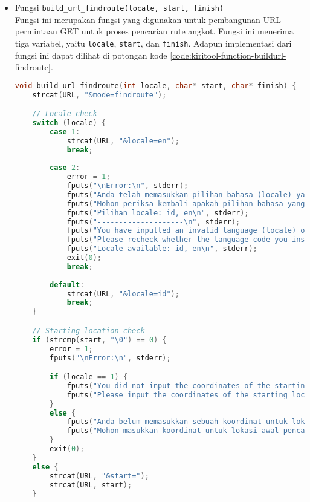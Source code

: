 \begin{itemize}[listparindent=\parindent]
	\item Fungsi \verb|build_url_findroute(locale, start, finish)| \\
	Fungsi ini merupakan fungsi yang digunakan untuk pembangunan URL permintaan	GET untuk proses pencarian rute angkot. Fungsi ini menerima tiga variabel, yaitu \verb|locale|, \verb|start|, dan \verb|finish|. Adapun implementasi dari fungsi ini dapat dilihat di potongan kode \ref{code:kiritool-function-buildurl-findroute}.
	
	\begin{lstlisting}[language=C, caption=Implementasi fungsi build\textunderscore url\textunderscore findroute(), label=code:kiritool-function-buildurl-findroute]
void build_url_findroute(int locale, char* start, char* finish) {
    strcat(URL, "&mode=findroute");

    // Locale check
    switch (locale) {
        case 1:
            strcat(URL, "&locale=en");
            break;
        
        case 2:
            error = 1;
            fputs("\nError:\n", stderr);
            fputs("Anda telah memasukkan pilihan bahasa (locale) yang tidak valid.\n", stderr);
            fputs("Mohon periksa kembali apakah pilihan bahasa yang anda masukkan valid atau tidak.\n", stderr);
            fputs("Pilihan locale: id, en\n", stderr);
            fputs("--------------------\n", stderr);
            fputs("You have inputted an invalid language (locale) option.\n", stderr);
            fputs("Please recheck whether the language code you inserted was supported or not.\n", stderr);
            fputs("Locale available: id, en\n", stderr);
            exit(0);
            break;
        
        default:
            strcat(URL, "&locale=id");
            break;
    }

    // Starting location check
    if (strcmp(start, "\0") == 0) {
        error = 1;
        fputs("\nError:\n", stderr);

        if (locale == 1) {
            fputs("You did not input the coordinates of the starting location.\n", stderr);
            fputs("Please input the coordinates of the starting location through the corresponding option.\n", stderr);
        }
        else {
            fputs("Anda belum memasukkan sebuah koordinat untuk lokasi awal.\n", stderr);
            fputs("Mohon masukkan koordinat untuk lokasi awal pencarian rute melalui opsi yang sesuai.\n", stderr);
        }
        exit(0);
    }
    else {
        strcat(URL, "&start=");
        strcat(URL, start);
    }


\end{lstlisting}
\end{itemize}
